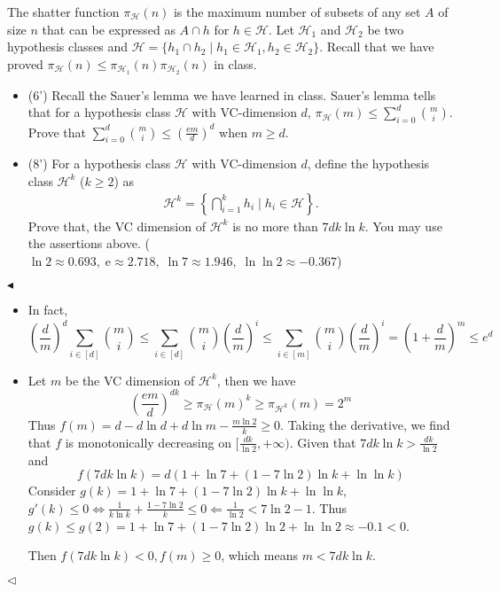 \documentclass[11pt]{article}
\newenvironment{problem}[2][Problem]{\begin{trivlist}
\item[\hskip \labelsep {\bfseries #1}\hskip \labelsep {\bfseries #2.}]}{\hfill$\blacktriangleleft$\end{trivlist}}
\newenvironment{answer}[1][Answer]{\begin{trivlist}
\item[\hskip \labelsep {\bfseries #1.}\hskip \labelsep]}{\hfill$\lhd$\end{trivlist}}
\begin{document}
\begin{problem}{6 (14')} The shatter function $\pi_\mathcal{H}(n)$ is the maximum number of subsets of any set $A$ of size $n$ that can be expressed as $A\cap h$ for $h\in \mathcal{H}$. Let $\mathcal{H}_1$ and $\mathcal{H}_2$ be two hypothesis classes and $\mathcal{H}=\{h_1\cap h_2\mid h_1\in \mathcal{H}_1,h_2\in \mathcal{H}_2\}$. Recall that we have proved $\pi_\mathcal{H}(n)\leq\pi_{\mathcal{H}_1}(n)\pi_{\mathcal{H}_2}(n)$ in class. 

\begin{itemize}
    \item [(1)] (6') Recall the Sauer's lemma we have learned in class. Sauer's lemma tells that for a hypothesis class $\mathcal{H}$ with VC-dimension $d$, $\pi_\mathcal{H}(m)\leq\sum_{i=0}^d\binom{m}{i}$. Prove that $\sum_{i=0}^d\binom{m}{i}\leq\left(\frac{\mathrm{e}m}{d}\right)^d$ when $m\geq d$.
    \item [(2)] (8') For a hypothesis class $\mathcal{H}$ with VC-dimension $d$, define the hypothesis class $\mathcal{H}^k$ ($k\geq 2$) as
    \begin{align*}
        \mathcal{H}^k=\left\{\bigcap_{i=1}^k h_i\;\big|\; h_i\in \mathcal{H}\right\}.
    \end{align*}
    Prove that, the VC dimension of $\mathcal{H}^k$ is no more than $7dk\ln k$. You may use the assertions above. ($\ln 2\approx0.693,\;\mathrm{e}\approx2.718,\;\ln 7\approx 1.946,\;\ln\ln 2\approx-0.367$)
\end{itemize}
\end{problem}

\begin{answer}
\begin{itemize}
    \item [(1)] In fact,
$$ \left(\frac{d}{m}\right)^d\sum_{i\in [d]}\binom{m}{i}\leq \sum_{i\in [d]}\binom{m}{i} \left(\frac{d}{m}\right)^i \leq \sum_{i\in [m]}\binom{m}{i} \left(\frac{d}{m}\right)^i = \left(1+\frac{d}{m}\right)^m\leq e^d$$
    \item [(2)]
    Let $m$ be the VC dimension of $\mathcal{H}^k$, then we have
    $$\left(\frac{em}{d}\right)^{dk}\ge\pi_{\mathcal{H}}(m)^k\ge \pi_{\mathcal{H}^k}(m) = 2^m$$
    Thus $f(m) = d-d\ln d+d\ln m - \frac{m\ln 2}{k} \ge 0$. Taking the derivative, we find that $f$ is monotonically decreasing on $[\frac{dk}{\ln 2},+\infty)$. Given that $7dk\ln k > \frac{dk}{\ln 2}$ and
    $$f(7dk\ln k) = d\left(1+\ln 7+(1-7\ln 2)\ln k +\ln\ln k\right)$$
    Consider $g(k) = 1+\ln 7+(1-7\ln 2)\ln k +\ln\ln k$, $g'(k) \leq 0 \Leftrightarrow \frac{1}{k\ln k}+\frac{1-7\ln 2}{k}\leq 0\Leftarrow \frac{1}{\ln 2} <7\ln 2-1$. 
    Thus $g(k)\leq g(2) = 1+\ln 7+(1-7\ln 2)\ln 2 +\ln\ln 2 \approx -0.1<0$.
    
    Then $f(7dk\ln k) < 0, f(m) \ge 0$, which means $m<7dk\ln k$.
\end{itemize} 
\end{answer}
\end{document}
